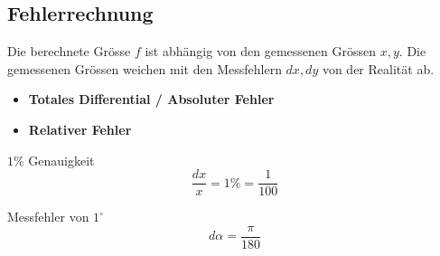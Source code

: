 \subsection{Fehlerrechnung}
    Die berechnete Grösse $f$ ist abhängig von den gemessenen Grössen $x,y$.
    Die gemessenen Grössen weichen mit den Messfehlern $dx,dy$ von der Realität ab.
    \begin{itemize}
        \item \textbf{Totales Differential / Absoluter Fehler}
        \item \textbf{Relativer Fehler}
    \end{itemize}
        \vspace{0.5em}
        \begin{minipage}{0.54\linewidth}
            \centering \vspace{4pt}
            $1\%$ Genauigkeit
            $$
                \frac{dx}{x} = 1\% = \frac{1}{100}
            $$          
        \end{minipage}
        \begin{minipage}{0.45\linewidth}
            \centering
            Messfehler von $1^\circ$
            $$
                d\alpha = \frac{\pi}{180}
            $$
        \end{minipage}